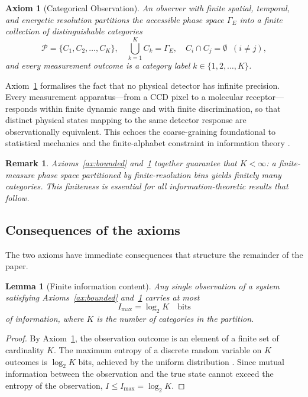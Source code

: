 \documentclass[11pt,twocolumn,a4paper]{article}
\newtheorem{axiom}{Axiom}
\newtheorem{lemma}[theorem]{Lemma}
\newtheorem{remark}{Remark}
\newcommand{\phasespace}{\Gamma}
\begin{document}
\begin{axiom}[Categorical Observation]\label{ax:categorical}
An observer with finite spatial, temporal, and energetic resolution partitions the accessible phase space $\phasespace_E$ into a finite collection of distinguishable categories
\begin{equation}\label{eq:partition}
\mathcal{P} = \{C_1, C_2, \ldots, C_K\}, \quad \bigcup_{k=1}^{K} C_k = \phasespace_E, \quad C_i \cap C_j = \emptyset \;\; (i \neq j),
\end{equation}
and every measurement outcome is a category label $k \in \{1, 2, \ldots, K\}$.
\end{axiom}

Axiom~\ref{ax:categorical} formalises the fact that no physical detector has infinite precision.
Every measurement apparatus---from a CCD pixel to a molecular receptor---responds within finite dynamic range and with finite discrimination, so that distinct physical states mapping to the same detector response are observationally equivalent.
This echoes the coarse-graining foundational to statistical mechanics \citep{Boltzmann1877,Jaynes1957} and the finite-alphabet constraint in information theory \citep{Shannon1948}.

\begin{remark}
Axioms~\ref{ax:bounded} and~\ref{ax:categorical} together guarantee that $K < \infty$: a finite-measure phase space partitioned by finite-resolution bins yields finitely many categories.
This finiteness is essential for all information-theoretic results that follow.
\end{remark}

\subsection{Consequences of the axioms}

The two axioms have immediate consequences that structure the remainder of the paper.

\begin{lemma}[Finite information content]\label{lem:finite_info}
Any single observation of a system satisfying Axioms~\ref{ax:bounded} and~\ref{ax:categorical} carries at most
\begin{equation}\label{eq:maxinfo}
I_{\max} = \log_2 K \quad \text{bits}
\end{equation}
of information, where $K$ is the number of categories in the partition.
\end{lemma}
\begin{proof}
By Axiom~\ref{ax:categorical}, the observation outcome is an element of a finite set of cardinality $K$.
The maximum entropy of a discrete random variable on $K$ outcomes is $\log_2 K$ bits, achieved by the uniform distribution \citep{Shannon1948,CoverThomas2006}.
Since mutual information between the observation and the true state cannot exceed the entropy of the observation, $I \leq I_{\max} = \log_2 K$.
\end{proof}
\end{document}
